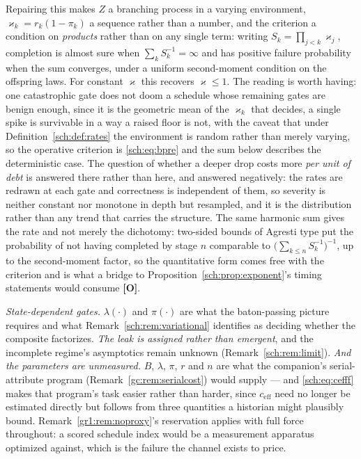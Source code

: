 \documentclass[11pt]{article}
\numberwithin{equation}{section}
\theoremstyle{plain}
\theoremstyle{definition}
\theoremstyle{remark}
\begin{document}
Repairing this makes $Z$ a branching process in a varying environment,
$\varkappa_k=r_k(1-\pi_k)$ a sequence rather than a number, and the criterion a
condition on \emph{products} rather than on any single term: writing
$S_k=\prod_{j<k}\varkappa_j$, completion is almost sure when
$\sum_k S_k^{-1}=\infty$ and has positive failure probability when the
sum converges, under a uniform second-moment condition on the offspring
laws. For constant $\varkappa$ this recovers $\varkappa\le1$. The reading is worth
having: one catastrophic gate does not doom a schedule whose remaining
gates are benign enough, since it is the geometric mean of the $\varkappa_k$
that decides, a single spike is survivable in a way a raised floor is
not, with the caveat that under Definition~\ref{sch:def:rates} the
environment is random rather than merely varying, so the operative
criterion is \eqref{sch:eq:bpre} and the sum below describes the
deterministic case. The question of whether a deeper drop costs more
\emph{per unit of debt} is answered there rather than here, and answered
negatively: the rates are redrawn at each gate and correctness is
independent of them, so severity is neither constant nor monotone in
depth but resampled, and it is the distribution rather than any trend
that carries the structure. The same harmonic sum gives the rate and not
merely the dichotomy:
two-sided bounds of Agresti type put the probability of not having
completed by stage $n$ comparable to $\bigl(\sum_{k\le n}S_k^{-1}
\bigr)^{-1}$, up to the second-moment factor, so the quantitative form
comes free with the criterion and is what a bridge to
Proposition~\ref{sch:prop:exponent}'s timing statements would consume
\textbf{[O]}.

\emph{State-dependent gates.} $\lambda(\cdot)$ and $\pi(\cdot)$ are what
the baton-passing picture requires and what
Remark~\ref{sch:rem:variational} identifies as deciding whether the
composite factorizes. \emph{The leak is assigned rather than emergent}, and the incomplete
regime's asymptotics remain unknown (Remark~\ref{sch:rem:limit}). \emph{And the parameters are unmeasured.} $B$, $\lambda$, $\pi$, $r$ and
$n$ are what the companion's serial-attribute program
(Remark~\ref{gc:rem:serialcost}) would supply --- and \eqref{sch:eq:cefff}
makes that program's task easier rather than harder, since
$c_{\mathrm{eff}}$ need no longer be estimated directly but follows from
three quantities a historian might plausibly bound.
Remark~\ref{gr1:rem:noproxy}'s reservation applies with full force
throughout: a scored schedule index would be a measurement apparatus
optimized against, which is the failure the channel exists to price.
\end{document}
